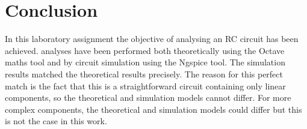 \section{Conclusion}
\label{sec:conclusion}

In this laboratory assignment the objective of analysing an RC circuit has been
achieved. analyses have been performed both
theoretically using the Octave maths tool and by circuit simulation using the
Ngspice tool. The simulation results matched the theoretical results
precisely. The reason for this perfect match is the fact that this is a
straightforward circuit containing only linear components, so the theoretical
and simulation models cannot differ. For more complex components, the
theoretical and simulation models could differ but this is not the case in this
work.

